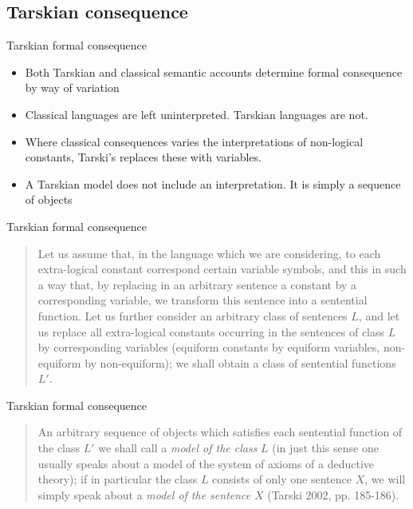 \documentclass{beamer}
\begin{document}
\subsection{Tarskian consequence}
\begin{frame}{Tarskian formal consequence}
	\begin{itemize}
		\item Both Tarskian and classical semantic accounts determine formal consequence by way of variation
		\pause 
		\item Classical languages are left uninterpreted. Tarskian languages are not.
		\pause
		\item Where classical consequences varies the interpretations of non-logical constants, Tarski's replaces these with variables.
		\pause
		\item A Tarskian model does not include an interpretation. It is simply a sequence of objects
	\end{itemize}
\end{frame}

\begin{frame}{Tarskian formal consequence}
	\begin{quote}
		Let us assume that, in the language which we are considering, to each extra-logical constant correspond certain variable symbols, and this in such a way that, by replacing in an arbitrary sentence a constant by a corresponding variable, we transform this sentence into a sentential function. Let us further consider an arbitrary class of sentences $L$, and let us replace all extra-logical constants occurring in the sentences of class $L$ by corresponding variables (equiform constants by equiform variables, non-equiform by non-equiform); we shall obtain a class of sentential functions $L'$. 
	\end{quote}
\end{frame}

\begin{frame}{Tarskian formal consequence}
	\begin{quote}
		An arbitrary sequence of objects which satisfies each sentential function of the class $L'$ we shall call a \textit{model of the class} $L$ (in just this sense one usually speaks about a model of the system of axioms of a deductive theory); if in particular the class $L$ consists of only one sentence $X$, we will simply speak about a \textit{model of the sentence} $X$ (Tarski 2002, pp. 185-186).
	\end{quote}
\end{frame}
\end{document}
